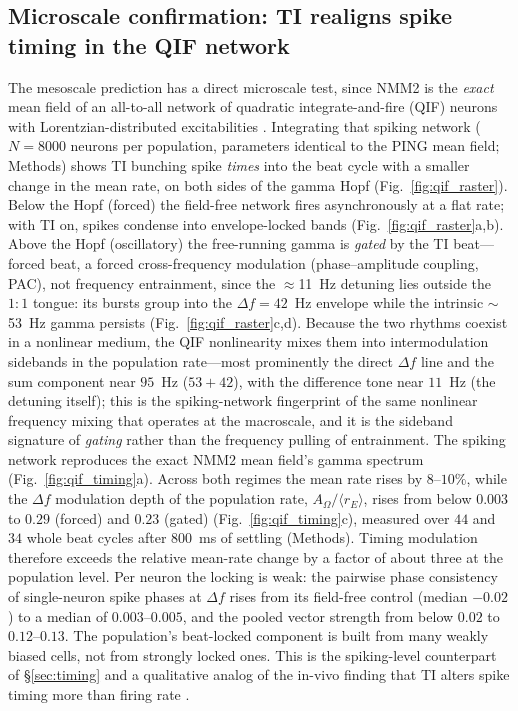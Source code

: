 \documentclass[11pt,a4paper]{article}
\providecommand{\DIFaddtex}[1]{{\protect\color{blue} \sf #1}} %
\providecommand{\DIFdeltex}[1]{{\protect\color{red} \scriptsize #1}} %
\providecommand{\DIFaddbegin}{} %
\providecommand{\DIFaddend}{} %
\providecommand{\DIFdelbegin}{} %
\providecommand{\DIFdelend}{} %
\providecommand{\DIFadd}[1]{\texorpdfstring{\DIFaddtex{#1}}{#1}} %
\providecommand{\DIFdel}[1]{\texorpdfstring{\DIFdeltex{#1}}{}} %
\begin{document}
\subsection{Microscale confirmation: TI realigns spike timing in the QIF network}\label{sec:qif}
The mesoscale prediction has a direct microscale test, since NMM2 is the \emph{exact} mean
field of an all-to-all network of quadratic integrate-and-fire (QIF) neurons with
Lorentzian-distributed excitabilities
\cite{montbrio2015,ruffini2025rosetta,clusella2023}. Integrating that spiking network
($N=8000$ neurons per population, parameters identical to the PING mean field; Methods)
shows TI bunching spike \emph{times} into the beat cycle with a smaller change in the mean
rate, on both sides of the gamma Hopf (Fig.~\ref{fig:qif_raster}). Below the Hopf (forced)
the field-free network fires asynchronously at a flat rate; with TI on, spikes condense
into envelope-locked bands (Fig.~\ref{fig:qif_raster}a,b). Above the Hopf (oscillatory) the
free-running gamma is \emph{gated} by the TI \DIFdelbegin \DIFdel{beat---forced }\DIFdelend \DIFaddbegin \DIFadd{beat, a forced }\DIFaddend cross-frequency modulation
(phase--amplitude coupling, PAC), not frequency entrainment, since the $\approx$11~Hz detuning lies outside the
$1{:}1$ tongue: its bursts group into the $\Delta f=42$~Hz envelope while the intrinsic
$\sim$53~Hz gamma persists (Fig.~\ref{fig:qif_raster}c,d). Because the two rhythms coexist
in a nonlinear medium, the QIF nonlinearity mixes them into intermodulation sidebands in
the population rate---most prominently the direct $\Delta f$ line and the sum component near
$95$~Hz ($53\!+\!42$), with the difference tone near $11$~Hz (the detuning itself); this is
the spiking-network fingerprint of the same nonlinear frequency mixing that operates at the
macroscale, and it is the sideband signature of \emph{gating} rather than the frequency
pulling of entrainment. The spiking network reproduces
the exact NMM2 mean field's gamma spectrum (Fig.~\ref{fig:qif_timing}a). Across both
regimes the mean rate rises by $8$--$10\%$, while the $\Delta f$ modulation depth of the
population rate, $A_\Omega/\langle r_E\rangle$, rises from below $0.003$ to $0.29$ (forced)
and $0.23$ (gated) (Fig.~\ref{fig:qif_timing}c), measured over $44$ and $34$ whole beat
cycles after $800$~ms of settling (Methods). Timing modulation therefore exceeds the
relative mean-rate change by a factor of about three at the population level. Per neuron
the locking is weak: the pairwise phase consistency of single-neuron spike phases at
$\Delta f$ rises from its field-free control (median $-0.02$) to a median of
$0.003$--$0.005$, and the pooled vector strength from below $0.02$ to $0.12$--$0.13$. The
population's beat-locked component is built from many weakly biased cells, not from
strongly locked ones. This is the spiking-level counterpart of \S\ref{sec:timing} and a
qualitative analog of the in-vivo finding that TI alters spike timing more than firing
rate \cite{vieira2024}.
\end{document}
